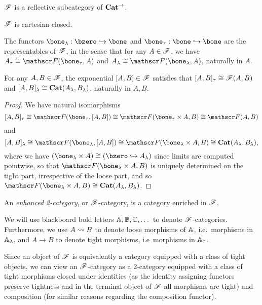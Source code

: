 \documentclass[../thesis.tex]{subfiles}
\begin{document}
  \begin{corollary}
    ${\mathscr{F}}$ is a reflective subcategory of ${\mathbf{Cat}}^\to$.
  \end{corollary}

  \begin{corollary}
    ${\mathscr{F}}$ is cartesian closed.
  \end{corollary}

  \begin{lemma}
    The functors $\bone_\lambda : \bzero \into \bone$ and $\bone_\tau : \bone \into \bone$ are the
    representables of ${\mathscr{F}}$, in the sense that for any $A \in {\mathscr{F}}$, we have $A_\tau \cong \sF(\bone_%
    \tau, A)$ and $A_\lambda
    \cong \sF(\bone_\lambda, A)$, naturally in $A$.
  \end{lemma}

  \begin{corollary}
    For any $A, B \in {\mathscr{F}}$, the exponential $[A,B] \in {\mathscr{F}}$ satisfies that $[A,B]_\tau \cong {\mathscr{F}}(A,B)
    $ and $[A,B]_\lambda \cong {\mathbf{Cat}}(A_\lambda, B_\lambda)$, naturally in $A,B$.
  \end{corollary}
  \begin{proof}
    We have natural isomorphisms
    \[[A,B]_\tau \cong \sF(\bone_\tau, [A,B]) \cong \sF(\bone_\tau \times A, B) \cong \sF(A,B)\]
    and
    \[[A,B]_\lambda \cong \sF(\bone_\lambda, [A,B]) \cong \sF(\bone_\lambda \times A, B) \cong
    \Cat(A_\lambda, B_\lambda),\]
    where we have $(\bone_\lambda \times A) \cong (\bzero \into A_\lambda)$ since limits are computed
    pointwise, so that $\sF(\bone_\lambda \times A, B)$ is uniquely determined on the tight part,
    irrespective of the loose part, and so $\sF(\bone_\lambda \times A, B) \cong \Cat(A_\lambda, B_%
    \lambda)$.
  \end{proof}
  
  \begin{definition}
    An \emph{enhanced 2-category}, or ${\mathscr{F}}$-category, is a category enriched in ${\mathscr{F}}$.
  \end{definition}
  \begin{notation}
    We will use blackboard bold letters ${\mathbb{A}},{\mathbb{B}},{\mathbb{C}},\dots$ to denote ${\mathscr{F}}$-categories. Furthermore,
    we use $A \rightsquigarrow B$ to denote loose morphisms of ${\mathbb{A}}$, i.e.\ morphisms in ${\mathbb{A}}_\lambda$, and
    $A \to B$ to denote tight morphisms, i.e\ morphisms in ${\mathbb{A}}_\tau$.
  \end{notation}
  \begin{remark}
    Since an object of ${\mathscr{F}}$ is equivalently a category equipped with a class of tight objects, we
    can  view an ${\mathscr{F}}$-category as a 2-category equipped with a class of tight morphisms closed under
    identities (as the identity assigning functors preserve tightness and in the terminal object of
    ${\mathscr{F}}$ all morphisms are tight) and composition (for similar reasons regarding the composition functor).
  \end{remark}
\end{document}

